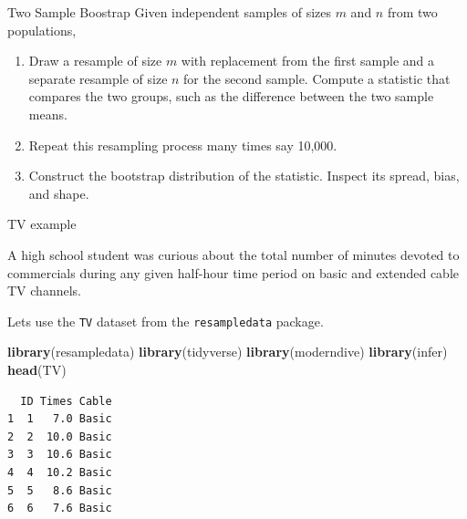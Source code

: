 \documentclass[
  ignorenonframetext,
]{beamer}
\newenvironment{Shaded}{\begin{snugshade}}{\end{snugshade}}
\newcommand{\FunctionTok}[1]{\textcolor[rgb]{0.13,0.29,0.53}{\textbf{#1}}}
\newcommand{\NormalTok}[1]{#1}
\begin{document}
\begin{frame}{Two Sample Boostrap}
\label{two-sample-boostrap-2}
Given independent samples of sizes \(m\) and \(n\) from two populations,

\begin{enumerate}
\item
  Draw a resample of size \(m\) with replacement from the first sample
  and a separate resample of size \(n\) for the second sample. Compute a
  statistic that compares the two groups, such as the difference between
  the two sample means.
\item
  Repeat this resampling process many times say 10,000.
\item
  Construct the bootstrap distribution of the statistic. Inspect its
  spread, bias, and shape.
\end{enumerate}
\end{frame}

\begin{frame}[fragile]{TV example}
\label{tv-example}
\begin{tcolorbox}
A high school student was curious about the total number of minutes devoted to commercials during any given half-hour time period on basic and extended cable TV channels.
\end{tcolorbox}

Lets use the \texttt{TV} dataset from the \texttt{resampledata} package.
\small

\begin{Shaded}
\begin{Highlighting}[]
\FunctionTok{library}\NormalTok{(resampledata)}
\FunctionTok{library}\NormalTok{(tidyverse)}
\FunctionTok{library}\NormalTok{(moderndive)}
\FunctionTok{library}\NormalTok{(infer)}
\FunctionTok{head}\NormalTok{(TV)}
\end{Highlighting}
\end{Shaded}

\begin{verbatim}
  ID Times Cable
1  1   7.0 Basic
2  2  10.0 Basic
3  3  10.6 Basic
4  4  10.2 Basic
5  5   8.6 Basic
6  6   7.6 Basic
\end{verbatim}

\normalsize
\end{frame}
\end{document}
